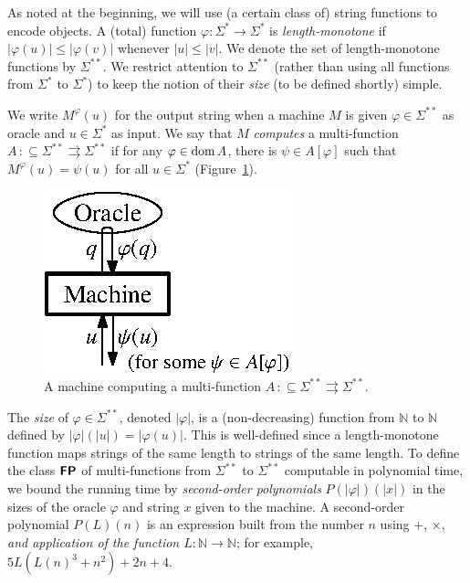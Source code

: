 \documentclass[conference]{IEEEtran}
\newcommand{\N}{\mathbb N}
\newcommand{\classtwofont}[1]{\text{\bfseries \sffamily \upshape #1}}
\newcommand{\classFPtwo}{\classtwofont{FP}}
\newcommand{\LM}{\varSigma ^{**}}
\newcommand{\dom}{\mathop{\rm dom}}
\theoremstyle{definition}
\theoremstyle{remark}
\newcommand{\pcolon}{\mathpunct{\,:\subseteq}}
\begin{document}
As noted at the beginning, 
we will use (a certain class of) string functions to encode objects. 
A (total) function $\varphi \colon \varSigma^* \to \varSigma^*$ is 
\emph{length-monotone}
if $|\varphi(u)| \le |\varphi(v)|$ whenever $|u| \le |v|$.
We denote the set of length-monotone functions by $\LM$.
We restrict attention to $\LM$ (rather than using
all functions from $\varSigma ^*$ to $\varSigma ^*$) 
to keep the notion of their \emph{size} (to be defined shortly) simple. 

We write $M ^\varphi (u)$ for the output string 
when a machine $M$ is given
$\varphi \in \LM$ as oracle and $u \in \varSigma ^*$ as input.
We say that $M$ \emph{computes} 
a multi-function $A \pcolon \LM \rightrightarrows \LM$ if 
for any $\varphi \in \dom A$, there is $\psi \in A[\varphi]$ 
such that $M^\varphi(u) = \psi(u)$ for all $u \in \varSigma^*$
(Figure~\ref{figure: oracle machine}).
\begin{figure}
\begin{center}
\includegraphics[scale=0.9]{./oracle_machine.eps}
\caption{A machine computing a multi-function $A \pcolon \LM \rightrightarrows \LM$.}
\label{figure: oracle machine}
\end{center}
\end{figure}

The \emph{size} of $\varphi \in \LM$, denoted $|\varphi|$,
is a (non-decreasing) function from $\N$ to $\N$ defined by 
$|\varphi|(|u|) = |\varphi(u)|$.
This is well-defined since a length-monotone function maps 
strings of the same length to strings of the same length.
To define the class $\classFPtwo$ of 
multi-functions from $\LM$ to $\LM$ 
computable in polynomial time, 
we bound the running time by \emph{second-order polynomials} 
$P (\lvert \varphi \rvert) (\lvert x \rvert)$ 
in the sizes of the oracle $\varphi$ and string $x$
given to the machine. 
A second-order polynomial $P (L) (n)$ 
is an expression built from the number $n$ 
using $\mathord+$, $\mathord\times$, 
\emph{and application of the function $L \colon \N \to \N$}; 
for example, 
$5 L (L (n) ^3 + n^2) + 2 n + 4$. 
\end{document}
